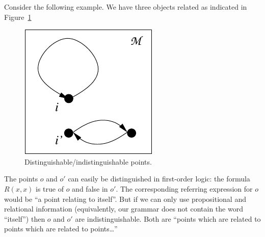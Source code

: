 Consider the following example.  We have three objects related as indicated in
Figure~\ref{fig-car1}
\begin{figure}
\begin{center}
\includegraphics{pic.pdf}
\end{center}
\caption{Distinguishable/indistinguishable points.}\label{fig-car1}
\end{figure}

The points $o$ and $o'$ can easily be distinguished in first-order logic:
the formula $R(x,x)$ is true of $o$ and false in $o'$. The corresponding
referring expression for $o$ would be ``a point relating to itself''.
But if we can only use propositional and relational information (equivalently, our grammar does not contain the word ``itself'') then $o$ and $o'$ are indistinguishable. Both
are ``points which are related to points which are related to points\ldots''



\cite{dovier04:_effic_algor_for_comput_bisim_equiv}

